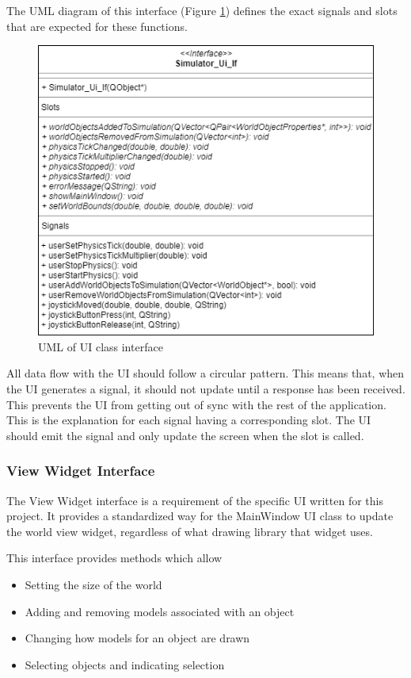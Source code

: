   The UML diagram of this interface (Figure \ref{uml:ui_if}) defines the exact signals and slots that are expected for these functions.
 \begin{figure}[h]
 	\begin{center}
 	\includegraphics[scale=0.5]{./images_design/uml/Ui_If}
 	\caption{UML of UI class interface\label{uml:ui_if}}
 	\end{center}
 \end{figure}
 
 All data flow with the UI should follow a circular pattern. This means that, when the UI generates a signal, it should not update until a response has been received. This prevents the UI from getting out of sync with the rest of the application. This is the explanation for each signal having a corresponding slot. The UI should emit the signal and only update the screen when the slot is called.
 	
  \subsubsection*{View Widget Interface}
  The View Widget interface is a requirement of the specific UI written for this project. It provides a standardized way for the MainWindow UI class to update the world view widget, regardless of what drawing library that widget uses.
  
  This interface provides methods which allow
  \begin{itemize}
  	\item Setting the size of the world
  	\item Adding and removing models associated with an object
  	\item Changing how models for an object are drawn
  	\item Selecting objects and indicating selection
  \end{itemize}
  
